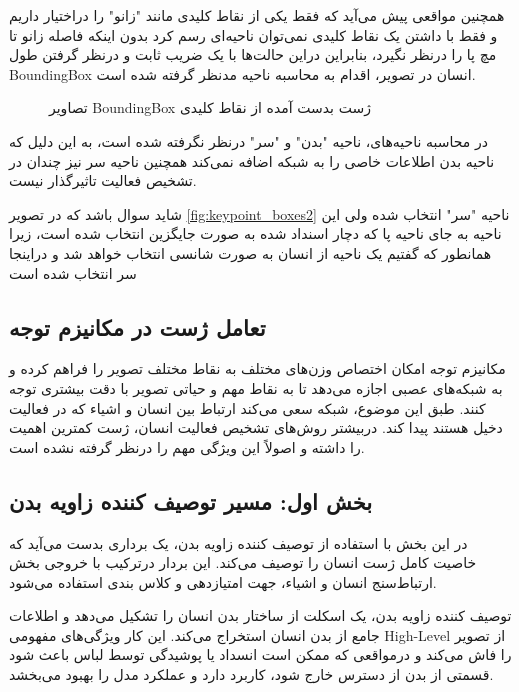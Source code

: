 همچنین مواقعی پیش می‌آید که فقط یکی از نقاط کلیدی مانند "زانو" را دراختیار داریم و فقط با داشتن یک نقاط کلیدی نمی‌توان ناحیه‌ای رسم کرد بدون اینکه فاصله زانو تا مچ پا را درنظر نگیرد، بنابراین دراین حالت‌ها با یک ضریب ثابت و درنظر گرفتن طول %
\gls{BoundingBox}
 انسان در تصویر، اقدام به محاسبه ناحیه مدنظر گرفته شده است.
  \begin{figure}
	\centering
	\hfill
	\hfill
	\caption{تصاویر 
		\gls{BoundingBox}
		 ژست بدست آمده از نقاط کلیدی}
	\label{fig:keypoint_boxes}
\end{figure}

در محاسبه ناحیه‌های، ناحیه "بدن" و "سر" درنظر نگرفته شده است، به این دلیل که ناحیه بدن اطلاعات خاصی را به شبکه اضافه نمی‌کند همچنین ناحیه سر نیز چندان در تشخیص فعالیت تاثیرگذار نیست.

شاید سوال باشد که در تصویر %
\ref{fig:keypoint_boxes2}
 ناحیه "سر" انتخاب شده ولی این ناحیه به جای ناحیه پا که دچار اسنداد شده به صورت جایگزین انتخاب شده است، زیرا همانطور که گفتیم یک ناحیه از انسان به صورت شانسی انتخاب خواهد شد و دراینجا سر انتخاب شده است
 \subsection{تعامل ژست در مکانیزم توجه}
مکانیزم توجه امکان اختصاص وزن‌های مختلف به نقاط مختلف تصویر را فراهم کرده و به شبکه‌های عصبی اجازه می‌دهد تا به نقاط مهم و حیاتی تصویر با دقت بیشتری توجه کنند. طبق این موضوع، شبکه سعی می‌‌کند ارتباط بین انسان و اشیاء که در فعالیت دخیل هستند پیدا کند. دربیشتر روش‌های تشخیص فعالیت انسان، ژست کمترین اهمیت را داشته و اصولاً این ویژگی مهم را درنظر گرفته نشده است. 
 \subsection{بخش اول: مسیر توصیف کننده زاویه بدن }
 در این بخش با استفاده از توصیف کننده زاویه بدن،‌ یک برداری بدست می‌آید که خاصیت کامل ژست انسان را توصیف می‌کند. این بردار درترکیب با خروجی بخش ارتباط‌سنج انسان و اشیاء، جهت امتیاز‌دهی و کلاس بندی استفاده می‌شود.
 
 توصیف کننده زاویه بدن، یک اسکلت از ساختار بدن انسان را تشکیل می‌دهد و اطلاعات جامع از بدن انسان استخراج می‌کند. این کار ویژگی‌های مفهومی %
\gls{High-Level}
  از تصویر را فاش ‌می‌کند و درمواقعی که ممکن است انسداد یا پوشیدگی توسط لباس باعث شود قسمتی از بدن از دسترس خارج شود، کاربرد دارد و عملکرد مدل را بهبود می‌بخشد. 
  
